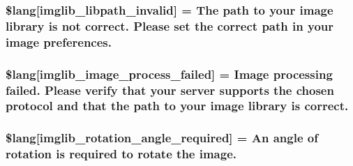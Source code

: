 \subsubsection[{\$lang}]{\setlength{\rightskip}{0pt plus 5cm}\$lang\mbox{[}\textquotesingle{}imglib\+\_\+libpath\+\_\+invalid\textquotesingle{}\mbox{]} = \textquotesingle{}The path to your image library is not correct. Please set the correct path in your image preferences.\textquotesingle{}}\label{_admin_2system_2language_2english_2imglib__lang_8php_a8f190c17a02ca89334c8bf0a04333f65}
\hypertarget{_admin_2system_2language_2english_2imglib__lang_8php_a9ac6659eb97dd12e5c714cc9635cf22e}{}
\subsubsection[{\$lang}]{\setlength{\rightskip}{0pt plus 5cm}\$lang\mbox{[}\textquotesingle{}imglib\+\_\+image\+\_\+process\+\_\+failed\textquotesingle{}\mbox{]} = \textquotesingle{}Image processing failed. Please verify that your server supports the chosen protocol and that the path to your image library is correct.\textquotesingle{}}\label{_admin_2system_2language_2english_2imglib__lang_8php_a9ac6659eb97dd12e5c714cc9635cf22e}
\hypertarget{_admin_2system_2language_2english_2imglib__lang_8php_a1110d59ea8fd0564e78068dbda3438fb}{}
\subsubsection[{\$lang}]{\setlength{\rightskip}{0pt plus 5cm}\$lang\mbox{[}\textquotesingle{}imglib\+\_\+rotation\+\_\+angle\+\_\+required\textquotesingle{}\mbox{]} = \textquotesingle{}An angle of rotation is required to rotate the image.\textquotesingle{}}\label{_admin_2system_2language_2english_2imglib__lang_8php_a1110d59ea8fd0564e78068dbda3438fb}
\hypertarget{_admin_2system_2language_2english_2imglib__lang_8php_a8ff486c25806a4731d1ffe20431df825}{}
